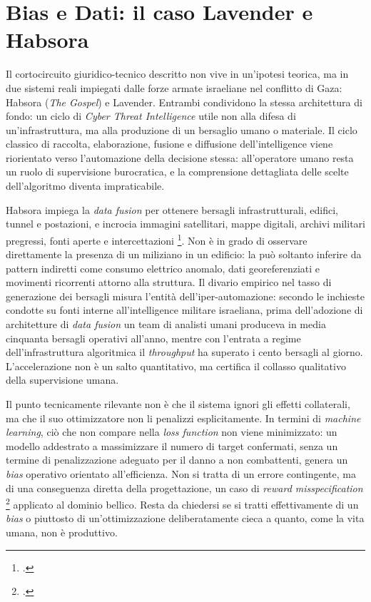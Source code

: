 \documentclass[a4paper,12pt]{report}
\begin{document}
\section{Bias e Dati: il caso Lavender e Habsora}

Il cortocircuito giuridico-tecnico descritto non vive in un'ipotesi teorica, ma
in due sistemi reali impiegati dalle forze armate israeliane nel conflitto di
Gaza: Habsora (\textit{The Gospel}) e Lavender. Entrambi condividono la stessa
architettura di fondo: un ciclo di \textit{Cyber Threat Intelligence} utile non
alla difesa di un'infrastruttura, ma alla produzione di un bersaglio umano o
materiale. Il ciclo classico di raccolta, elaborazione, fusione e diffusione
dell'intelligence viene riorientato verso l'automazione della decisione stessa:
all'operatore umano resta un ruolo di supervisione burocratica, e la comprensione
dettagliata delle scelte dell'algoritmo diventa impraticabile.

Habsora impiega la \textit{data fusion} per ottenere bersagli infrastrutturali,
edifici, tunnel e postazioni, e incrocia immagini satellitari, mappe digitali,
archivi militari pregressi, fonti aperte e intercettazioni
\footcite{abraham_2023_gospel}. Non è in grado di osservare direttamente la
presenza di un miliziano in un edificio: la può soltanto inferire da pattern
indiretti come consumo elettrico anomalo, dati georeferenziati e movimenti
ricorrenti attorno alla struttura. Il divario empirico nel tasso di generazione
dei bersagli misura l'entità dell'iper-automazione: secondo le inchieste condotte
su fonti interne all'intelligence militare israeliana, prima dell'adozione di
architetture di \textit{data fusion} un team di analisti umani produceva in media
cinquanta bersagli operativi all'anno, mentre con l'entrata a regime
dell'infrastruttura algoritmica il \textit{throughput} ha superato i cento
bersagli al giorno. L'accelerazione non è un salto quantitativo, ma certifica il
collasso qualitativo della supervisione umana.

Il punto tecnicamente rilevante non è che il sistema ignori gli effetti
collaterali, ma che il suo ottimizzatore non li penalizzi esplicitamente. In
termini di \textit{machine learning}, ciò che non compare nella \textit{loss
function} non viene minimizzato: un modello addestrato a massimizzare il numero
di target confermati, senza un termine di penalizzazione adeguato per il danno a
non combattenti, genera un \textit{bias} operativo orientato all'efficienza. Non
si tratta di un errore contingente, ma di una conseguenza diretta della
progettazione, un caso di \textit{reward misspecification} \footcite{amodei_2016}
applicato al dominio bellico. Resta da chiedersi se si tratti effettivamente di
un \textit{bias} o piuttosto di un'ottimizzazione deliberatamente cieca a quanto,
come la vita umana, non è produttivo.
\end{document}
